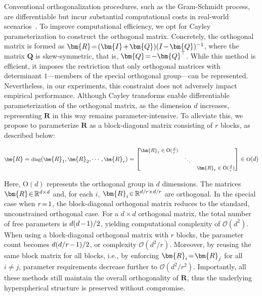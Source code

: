 Conventional orthogonalization procedures, such as the Gram-Schmidt process, are differentiable but incur substantial computational costs in real-world scenarios~\cite{liu2021orthogonal}. To improve computational efficiency, we opt for Cayley parameterization to construct the orthogonal matrix. Concretely, the orthogonal matrix is formed as $\thickmuskip=2mu \medmuskip=2mu \bm{R} = (\bm{I}+\bm{Q})(I-\bm{Q})^{-1}$, where the matrix $\bm{Q}$ is skew-symmetric, that is, $\thickmuskip=2mu \medmuskip=2mu \bm{Q} = -\bm{Q}^\top$. While this method is efficient, it imposes the restriction that only orthogonal matrices with determinant $1$—members of the special orthogonal group—can be represented. Nevertheless, in our experiments, this constraint does not adversely impact empirical performance. Although Cayley transforms enable differentiable parameterization of the orthogonal matrix, as the dimension $d$ increases, representing $\bm{R}$ in this way remains parameter-intensive. To alleviate this, we propose to parameterize $\bm{R}$ as a block-diagonal matrix consisting of $r$ blocks, as described below:

\begin{equation}
    \footnotesize
    \bm{R} = \text{diag}(\bm{R}_1, \bm{R}_2, \cdots, \bm{R}_r) = \begin{bmatrix}
    \bm{R}_1\in \text{O}(\frac{d}{r}) &  &\\
    &\ddots & \\
    & & \bm{R}_r\in \text{O}(\frac{d}{r})
    \end{bmatrix}\in \text{O}(d)
\end{equation}

Here, $\text{O}(d)$ represents the orthogonal group in $d$ dimensions. The matrices $\thickmuskip=2mu \medmuskip=2mu \bm{R} \in \mathbb{R}^{d \times d}$ and, for each $i$, $\thickmuskip=2mu \medmuskip=2mu \bm{R}_i \in \mathbb{R}^{d/r \times d/r}$ are orthogonal. In the special case when $\thickmuskip=2mu \medmuskip=2mu r = 1$, the block-diagonal orthogonal matrix reduces to the standard, unconstrained orthogonal case. For a $d \times d$ orthogonal matrix, the total number of free parameters is $\thickmuskip=2mu \medmuskip=2mu d(d-1)/2$, yielding computational complexity of $\mathcal{O}(d^2)$. When using a block-diagonal orthogonal matrix with $r$ blocks, the parameter count becomes $\thickmuskip=2mu \medmuskip=2mu d(d/r-1)/2$, or complexity $\mathcal{O}(d^2/r)$. Moreover, by reusing the same block matrix for all blocks, i.e., by enforcing $\thickmuskip=2mu \medmuskip=2mu \bm{R}_i = \bm{R}_j$ for all $i \neq j$, parameter requirements decrease further to $\mathcal{O}(d^2/r^2)$. Importantly, all these methods still maintain the overall orthogonality of $\bm{R}$, thus the underlying hyperspherical structure is preserved without compromise.

